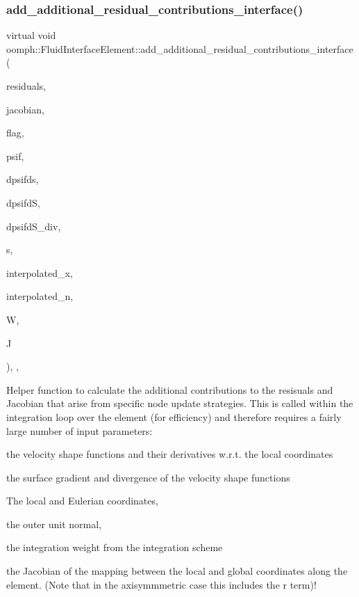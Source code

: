 \subsubsection{\texorpdfstring{add\+\_\+additional\+\_\+residual\+\_\+contributions\+\_\+interface()}{add\_additional\_residual\_contributions\_interface()}}
{\footnotesize\ttfamily virtual void oomph\+::\+Fluid\+Interface\+Element\+::add\+\_\+additional\+\_\+residual\+\_\+contributions\+\_\+interface (\begin{DoxyParamCaption}\item[{\hyperlink{classoomph_1_1Vector}{Vector}$<$ double $>$ \&}]{residuals,  }\item[{\hyperlink{classoomph_1_1DenseMatrix}{Dense\+Matrix}$<$ double $>$ \&}]{jacobian,  }\item[{const unsigned \&}]{flag,  }\item[{const \hyperlink{classoomph_1_1Shape}{Shape} \&}]{psif,  }\item[{const \hyperlink{classoomph_1_1DShape}{D\+Shape} \&}]{dpsifds,  }\item[{const \hyperlink{classoomph_1_1DShape}{D\+Shape} \&}]{dpsifdS,  }\item[{const \hyperlink{classoomph_1_1DShape}{D\+Shape} \&}]{dpsifd\+S\+\_\+div,  }\item[{const \hyperlink{classoomph_1_1Vector}{Vector}$<$ double $>$ \&}]{s,  }\item[{const \hyperlink{classoomph_1_1Vector}{Vector}$<$ double $>$ \&}]{interpolated\+\_\+x,  }\item[{const \hyperlink{classoomph_1_1Vector}{Vector}$<$ double $>$ \&}]{interpolated\+\_\+n,  }\item[{const double \&}]{W,  }\item[{const double \&}]{J }\end{DoxyParamCaption})\hspace{0.3cm}{\ttfamily [inline]}, {\ttfamily [protected]}, {\ttfamily [virtual]}}



Helper function to calculate the additional contributions to the resisuals and Jacobian that arise from specific node update strategies. This is called within the integration loop over the element (for efficiency) and therefore requires a fairly large number of input parameters\+: 


\begin{DoxyItemize}
\item the velocity shape functions and their derivatives w.\+r.\+t. the local coordinates
\item the surface gradient and divergence of the velocity shape functions
\item The local and Eulerian coordinates,
\item the outer unit normal,
\item the integration weight from the integration scheme
\item the Jacobian of the mapping between the local and global coordinates along the element. (Note that in the axisymmmetric case this includes the r term)! 
\end{DoxyItemize}


